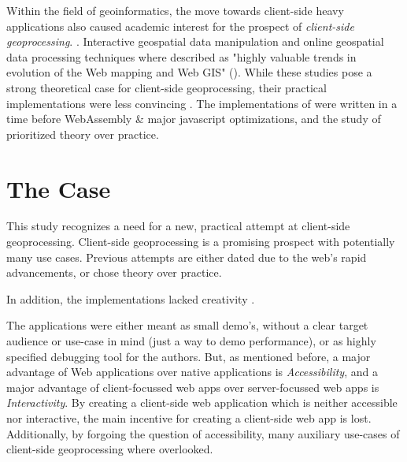 Within the field of geoinformatics, the move towards client-side heavy applications also caused academic interest for the prospect of \emph{client-side geoprocessing}. \cite{kulawiak_analysis_2019, panidi_hybrid_2015, hamilton_client-side_2014}. 
Interactive geospatial data manipulation and online geospatial data processing techniques where described as "highly valuable trends in evolution of the Web mapping and Web GIS" (\cite{panidi_hybrid_2015}). 
While these studies pose a strong theoretical case for client-side geoprocessing, their practical implementations were less convincing . 
The implementations of \cite{panidi_hybrid_2015, hamilton_client-side_2014} were written in a time before WebAssembly \& major javascript optimizations, and the study of \cite{kulawiak_analysis_2019} prioritized theory over practice. 


\section{ The Case }


This study recognizes a need for a new, practical attempt at client-side geoprocessing. 
Client-side geoprocessing is a promising prospect with potentially many use cases.
Previous attempts are either dated due to the web's rapid advancements, or chose theory over practice.

In addition, the implementations lacked creativity . 

The applications were either meant as small demo's, without a clear target audience or use-case in mind (just a way to demo performance), or as highly specified debugging tool for the authors.   
But, as mentioned before, a major advantage of Web applications over native applications is \emph{Accessibility}, and a major advantage of client-focussed web apps over server-focussed web apps is \emph{Interactivity}. 
By creating a client-side web application which is neither accessible nor interactive, the main incentive for creating a client-side web app is lost.
Additionally, by forgoing the question of accessibility, many auxiliary use-cases of client-side geoprocessing where overlooked.

